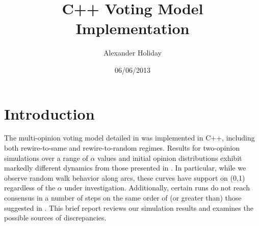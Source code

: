 \documentclass[11pt]{article}
\begin{document}
\title{C++ Voting Model Implementation}
\author{Alexander Holiday\vspace{-2ex}}
\date{06/06/2013}
\maketitle
\section*{Introduction}
The multi-opinion voting model detailed in \cite{durret:pnas12} was implemented in C++, including both rewire-to-same and rewire-to-random regimes. Results for two-opinion simulations over a range of $\alpha$ values and initial opinion distributions exhibit markedly different dynamics from those presented in \cite{durret:pnas12}. In particular, while we observe random walk behavior along arcs, these curves have support on (0,1) regardless of the $\alpha$ under investigation. Additionally, certain runs do not reach consensus in a number of steps on the same order of (or greater than) those suggested in \cite{durret:pnas12}. This brief report reviews our simulation results and examines the possible sources of discrepancies.
\end{document}
